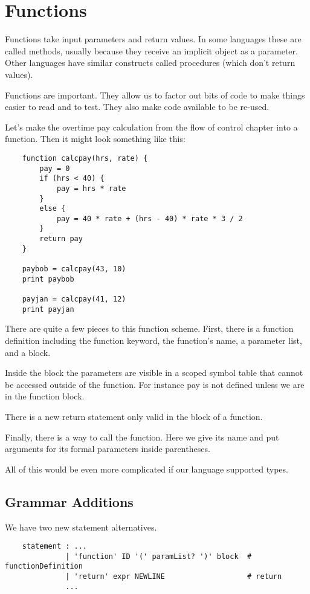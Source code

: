 \chapter{Functions}

Functions take input parameters and return values. In some languages
these are called methods, usually because they receive an implicit
object as a parameter. Other languages have similar constructs called
procedures (which don't return values).

Functions are important. They allow us to factor out bits of code
to make things easier to read and to test. They also make code
available to be re-used.

Let's make the overtime pay calculation from the flow of control
chapter into a function. Then it might look something like this:

{\footnotesize
\begin{verbatim}
    function calcpay(hrs, rate) {
        pay = 0
        if (hrs < 40) {
            pay = hrs * rate
        }
        else {
            pay = 40 * rate + (hrs - 40) * rate * 3 / 2
        }
        return pay
    }

    paybob = calcpay(43, 10)
    print paybob

    payjan = calcpay(41, 12)
    print payjan
\end{verbatim}
}

There are quite a few pieces to this function scheme. First, there
is a function definition including the function keyword, the function's
name, a parameter list, and a block.

Inside the block the parameters are visible in a scoped symbol
table that cannot be accessed outside of the function. For instance
pay is not defined unless we are in the function block.

There is a new return statement only valid in the block of a function.

Finally, there is a way to call the function. Here we give its name
and put arguments for its formal parameters inside parentheses.

All of this would be even more complicated if our language supported
types.

\section{Grammar Additions}

We have two new statement alternatives.

{\footnotesize
\begin{verbatim}
    statement : ...
              | 'function' ID '(' paramList? ')' block  # functionDefinition
              | 'return' expr NEWLINE                   # return
              ...
\end{verbatim}
}


